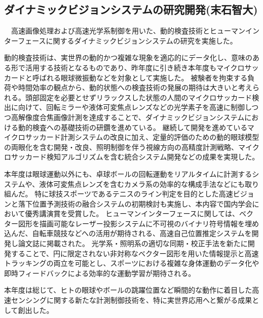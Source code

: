 \subsection{ダイナミックビジョンシステムの研究開発(末石智大)}

　高速画像処理および高速光学系制御を用いた、動的検査技術とヒューマンインターフェースに関するダイナミックビジョンシステムの研究を実施した。

動的検査技術は、実世界の動的かつ複雑な現象を適応的にデータ化し、意味のある形で活用する技術となるものであり、昨年度に引き続き本年度もマイクロサッカードと呼ばれる眼球微振動などを対象として実施した。
被験者を拘束する負荷や時間効率の観点から、動的状態への検査技術の発展の期待は大きいと考えられる。頭部固定を必要とせずリラックスした状態の人間のマイクロサッカード検出に向けて、回転ミラーや液体可変焦点レンズなどの光学素子を高速に制御しつつ高解像度合焦画像計測を達成することで、ダイナミックビジョンシステムにおける動的検査への基礎技術の研鑽を進めている。
継続して開発を進めているマイクロサッカード計測システムの改良に加え、定量的評価のための動的眼球模型の両眼化を含む開発・改良、照明制御を伴う視線方向の高精度計測戦略、マイクロサッカード検知アルゴリズムを含む統合システム開発などの成果を実現した。

本年度は眼球運動以外にも、卓球ボールの回転運動をリアルタイムに計測するシステムや、液体可変焦点レンズを含むカメラ系の効率的な構成手法などにも取り組んだ。
特に球技スポーツであるテニスのライン判定を目的とした高速ビジョンと落下位置予測技術の融合システムの初期検討も実施し、本内容で国内学会において優秀講演賞を受賞した。
ヒューマンインターフェースに関しては、ベクター図形を描画可能なレーザー投影システムに不可視のバイナリ符号情報を埋め込んだ、自転車競技などへの活用が期待される、高速自己位置推定システムを開発し論文誌に掲載された。
光学系・照明系の適切な同期・校正手法を新たに開発することで、円に限定されない非対称なベクター図形を用いた情報提示と高速トラッキングの両立を可能とし、スポーツにおける複雑な身体運動のデータ化や即時フィードバックによる効率的な運動学習が期待される。

本年度は総じて、ヒトの眼球やボールの跳躍位置など瞬間的な動作に着目した高速センシングに関する新たな計測制御技術を、特に実世界応用へと繋がる成果として創出した。
